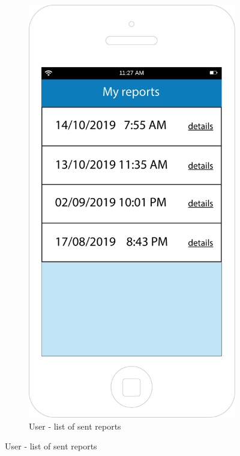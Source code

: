 \documentclass[12pt,a4paper]{report}
\begin{document}
		\begin{figure}[H]
		\begin{subfigure}{0.5\textwidth}
		\setcounter{subfigure}{2}
			\includegraphics[scale=0.25, center]{Myreports}
			\caption{User -  list of sent reports}

\end{subfigure}
\end{figure}
\end{document}
